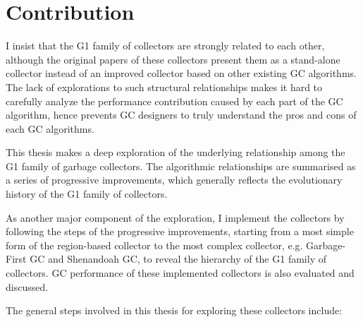 

\section{Contribution}

I insist that the G1 family of collectors are strongly related to each other,
although the original papers of these collectors present them as a stand-alone collector
instead of an improved collector based on other existing GC algorithms. The lack of
explorations to such structural relationships makes it hard to carefully analyze
the performance contribution caused by each part of the GC algorithm, hence prevents
GC designers to truly understand the pros and cons of each GC algorithms.

This thesis makes a deep exploration of the underlying relationship among the
G1 family of garbage collectors. The algorithmic relationships are summarised
as a series of progressive improvements, which generally reflects the evolutionary
history of the G1 family of collectors.

As another major component of the exploration, I implement the collectors by following
the steps of the progressive improvements, starting from a most simple form of the
region-based collector to the most complex collector, e.g. Garbage-First GC and
Shenandoah GC, to reveal the hierarchy of the G1 family of collectors.
GC performance of these implemented collectors is also evaluated and discussed.

The general steps involved in this thesis for exploring these collectors include:

